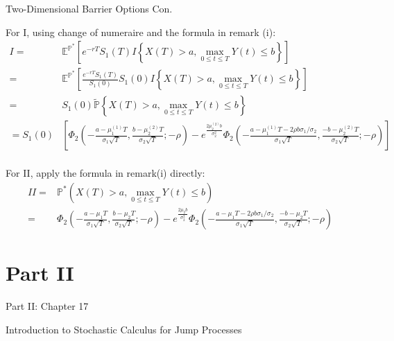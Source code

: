 \documentclass{beamer}
\begin{document}
\begin{frame}{Two-Dimensional Barrier Options Con.}

    {\footnotesize \footnotesize
    \par For I, using change of numeraire and the formula in remark (i):
    {\footnotesize \tiny
    \begin{align*}
        I = & \mathbb{E}^{\mathbb{P}^*}\left[ e^{-rT}S_1(T) I{\left\{ X(T) > a, \max\limits_{0 \leq t \leq T} Y(t) \leq b \right\}} \right] \\
        = & \mathbb{E}^{\mathbb{P}^*}\left[ \frac{e^{-rT}S_1(T)}{S_1(0)}S_1(0) I{\left\{ X(T) > a, \max\limits_{0 \leq t \leq T} Y(t) \leq b \right\}} \right] \\
        = &  S_1(0) \tilde{\mathbb{P}}{\left\{ X(T) > a, \max\limits_{0 \leq t \leq T} Y(t) \leq b \right\}} \\
        = S_1(0) & \left[\Phi_2 \left( -\frac{a - \mu_1^{(1)} T}{\sigma_1 \sqrt{T}}, \frac{b - \mu_2^{(2)} T}{\sigma_2 \sqrt{T}}; -\rho \right)
        - e^{\frac{2 \mu_2^{(2)} b}{\sigma_2^2} } \Phi_2 \left( -\frac{a - \mu_1^{(1)} T - 
        2\rho b\sigma_1/\sigma_2}{\sigma_1 \sqrt{T}}, \frac{-b - \mu_2^{(2)} T}{\sigma_2 \sqrt{T}}; -\rho \right)\right]\\
    \end{align*}
    }\pause
    \par For II, apply the formula in remark(i) directly:
    {\footnotesize \tiny
    \begin{align*}
        II = & {\mathbb{P}^*}(X(T) > a, \max\limits_{0 \leq t \leq T} Y(t) \leq b)\\
        = & \Phi_2 \left( -\frac{a - \mu_1 T}{\sigma_1 \sqrt{T}}, \frac{b - \mu_2 T}{\sigma_2 \sqrt{T}}; -\rho \right)
        - e^{\frac{2 \mu_2 b}{\sigma_2^2} } \Phi_2 \left( -\frac{a - \mu_1 T - 
        2\rho b\sigma_1/\sigma_2}{\sigma_1 \sqrt{T}}, \frac{-b - \mu_2 T}{\sigma_2 \sqrt{T}}; -\rho \right)
    \end{align*}
    }
    }
    
\end{frame}

\section{Part II}
\begin{frame}{Part II: Chapter 17}
    \begin{center}
        Introduction to Stochastic
    Calculus for Jump
    Processes
    \end{center}
\end{frame}
\end{document}
